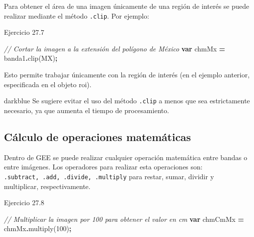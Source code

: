 \documentclass[
  12pt,
  letterpaper,
  twoside]{book}
\newenvironment{Shaded}{\begin{snugshade}}{\end{snugshade}}
\newcommand{\CommentTok}[1]{\textcolor[rgb]{0.56,0.35,0.01}{\textit{#1}}}
\newcommand{\DecValTok}[1]{\textcolor[rgb]{0.00,0.00,0.81}{#1}}
\newcommand{\FunctionTok}[1]{\textcolor[rgb]{0.00,0.00,0.00}{#1}}
\newcommand{\KeywordTok}[1]{\textcolor[rgb]{0.13,0.29,0.53}{\textbf{#1}}}
\newcommand{\NormalTok}[1]{#1}
\newcommand{\OperatorTok}[1]{\textcolor[rgb]{0.81,0.36,0.00}{\textbf{#1}}}
\begin{document}
Para obtener el área de una imagen únicamente de una región de interés se puede realizar mediante el método \texttt{.clip}. Por ejemplo:

Ejercicio 27.7

\begin{Shaded}
\begin{Highlighting}[]
\CommentTok{// Cortar la imagen a la extensión del polígono de México}
\KeywordTok{var}\NormalTok{ chmMx }\OperatorTok{=}\NormalTok{ banda1}\OperatorTok{.}\FunctionTok{clip}\NormalTok{(MX)}\OperatorTok{;}
\end{Highlighting}
\end{Shaded}

Esto permite trabajar únicamente con la región de interés (en el ejemplo anterior, especificada en el objeto roi).

\begin{bluebox2}

\begin{awesomeblock}{5pt}{\faLightbulb}{darkblue}
Se sugiere evitar el uso del método \texttt{.clip} a menos que sea estrictamente necesario, ya que aumenta el tiempo de procesamiento.

\end{awesomeblock}

\end{bluebox2}

\hypertarget{cuxe1lculo-de-operaciones-matemuxe1ticas}{%
\subsection{Cálculo de operaciones matemáticas}\label{cuxe1lculo-de-operaciones-matemuxe1ticas}}

Dentro de GEE se puede realizar cualquier operación matemática entre bandas o entre imágenes. Los operadores para realizar esta operaciones son: \texttt{.subtract,\ .add,\ .divide,\ .multiply} para restar, sumar, dividir y multiplicar, respectivamente.

Ejercicio 27.8

\begin{Shaded}
\begin{Highlighting}[]
\CommentTok{// Multiplicar la imagen por 100 para obtener el valor en cm}
\KeywordTok{var}\NormalTok{ chmCmMx }\OperatorTok{=}\NormalTok{ chmMx}\OperatorTok{.}\FunctionTok{multiply}\NormalTok{(}\DecValTok{100}\NormalTok{)}\OperatorTok{;}
\end{Highlighting}
\end{Shaded}
\end{document}
